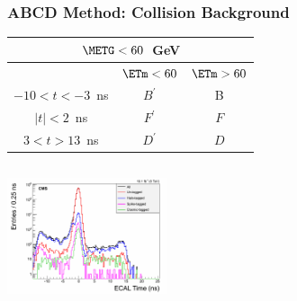 \documentclass{beamer}
\begin{document}
\begin{frame}
\frametitle{ABCD Method: Collision Background}
 \begin{minipage}[t]{0.8\paperwidth}
    \begin{tcolorbox}[colback=blue!5,colframe=UMN@Gold!40,title=\textcolor{UMN@Maroon}{\textcolor{UMN@Maroon}{\textbf{Collision Events.}}}]
      \centering
        \begin{tabular}{|c || c|| c|}
        \multicolumn{3}{c}{\bfseries{$\METG < 60$~GeV}} \\
        \hline \hline
          & $ \ETm < 60$ & $ \ETm > 60$ \\       
          \hline \hline
          $-10 < t < -3$~ns & $B^{\prime}$ &  B \\
          \hline \hline \hline    
          $ |t| < 2$~ns & $F^{\prime}$ &  $F$ \\
          \hline \hline \hline
          $ 3 < t > 13$~ns & $D^{\prime}$ &  $D$ \\
        \hline \hline
        \end{tabular} 
 \end{tcolorbox}   
\end{minipage}
\begin{minipage}[b]{0.8\paperwidth} 
  \begin{columns}
   \begin{column}{0.55\linewidth}
    \includegraphics[height=3.4cm,width=0.99\linewidth]{THESISPLOTS/TimeForAll.png}
  \end{column}
  \begin{column}{0.45\linewidth}

\end{column}
\end{columns}
\end{minipage}
\end{frame}
\end{document}
